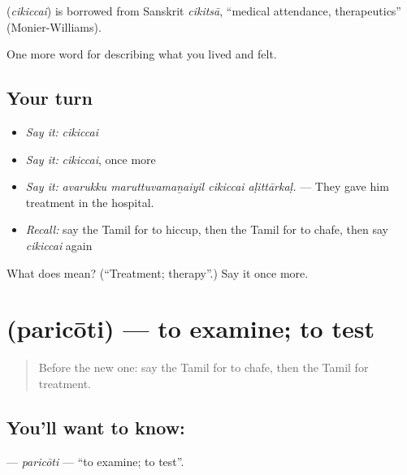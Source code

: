 \begin{cousinweb}
\textbf{} (\emph{cikiccai}) is borrowed from Sanskrit \emph{cikitsā}, \textquotedblleft{}medical attendance, therapeutics\textquotedblright{} (Monier-Williams).
\end{cousinweb}

\begin{grammarlens}[title={What you've built}]
One more word for describing what you lived and felt.
\end{grammarlens}

\subsection*{Your turn}
\begin{itemize}
\raggedright
  \item \emph{Say it:} \emph{cikiccai}
  \item \emph{Say it:} \emph{cikiccai}, once more
  \item \emph{Say it:} \emph{avarukku maruttuvamaṉaiyil cikiccai aḷittārkaḷ.} — They gave him treatment in the hospital.
  \item \emph{Recall:} say the Tamil for to hiccup, then the Tamil for to chafe, then say \emph{cikiccai} again
\end{itemize}

\begin{tcolorbox}[breakable,colback=teal!4,colframe=teal!35!black,title={Before you move on}]
What does  mean? (\textquotedblleft{}Treatment; therapy\textquotedblright{}.) Say it once more.
\end{tcolorbox}
\section[\texorpdfstring{\ta{பரிசோதி} (paricōti)}{பரிசோதி (paricōti)}]{ (paricōti) — to examine; to test}

\label{lesson:TA-C475-paricoti}



\begin{quote}
Before the new one: say the Tamil for to chafe, then the Tamil for treatment.
\end{quote}

\subsection*{You'll want to know: }
\textbf{} — \emph{paricōti} — \textquotedblleft{}to examine; to test\textquotedblright{}.

